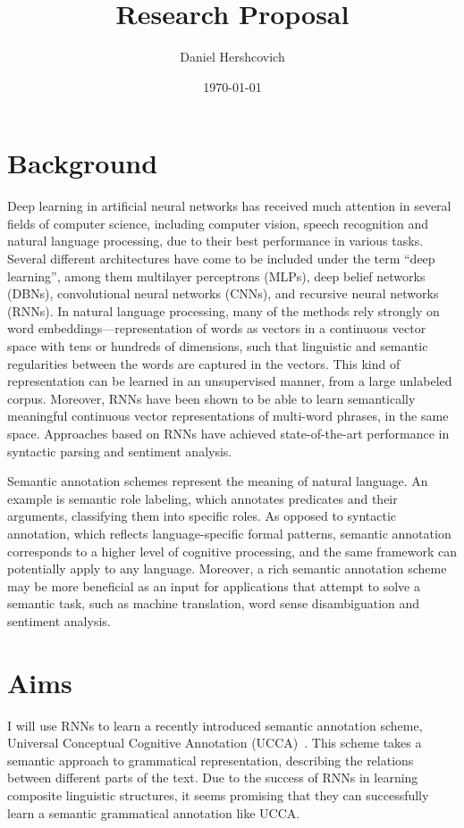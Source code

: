 \documentclass[11pt]{article}
\begin{document}
\title{Research Proposal}
\author{Daniel Hershcovich}
\date{\today}
\maketitle

\section{Background}

Deep learning in artificial neural networks has received much attention in several fields of computer science, including computer vision, speech recognition and natural language processing, due to their best performance in various tasks. Several different architectures have come to be included under the term “deep learning”, among them multilayer perceptrons (MLPs), deep belief networks (DBNs), convolutional neural networks (CNNs), and recursive neural networks (RNNs). In natural language processing, many of the methods rely strongly on word embeddings—representation of words as vectors in a continuous vector space with tens or hundreds of dimensions, such that linguistic and semantic regularities between the words are captured in the vectors. This kind of representation can be learned in an unsupervised manner, from a large unlabeled corpus. Moreover, RNNs have been shown to be able to learn semantically meaningful continuous vector representations of multi-word phrases, in the same space. Approaches based on RNNs have achieved state-of-the-art performance in syntactic parsing and sentiment analysis.

Semantic annotation schemes represent the meaning of natural language. An example is semantic role labeling, which annotates predicates and their arguments, classifying them into specific roles. As opposed to syntactic annotation, which reflects language-specific formal patterns, semantic annotation corresponds to a higher level of cognitive processing, and the same framework can potentially apply to any language. Moreover, a rich semantic annotation scheme may be more beneficial as an input for applications that attempt to solve a semantic task, such as machine translation, word sense disambiguation and sentiment analysis.


\section{Aims}

I will use RNNs to learn a recently introduced semantic annotation scheme, Universal Conceptual Cognitive Annotation (UCCA)~\cite{abend2013universal}. This scheme takes a semantic approach to grammatical representation, describing the relations between different parts of the text. Due to the success of RNNs in learning composite linguistic structures, it seems promising that they can successfully learn a semantic grammatical annotation like UCCA.
\end{document}
